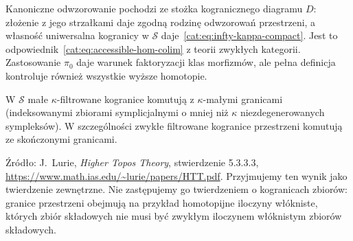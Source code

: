 Kanoniczne odwzorowanie pochodzi ze stożka kogranicznego diagramu $D$: złożenie z jego strzałkami daje zgodną rodzinę odwzorowań przestrzeni, a własność uniwersalna kogranicy w $\mathcal S$ daje~\eqref{cat:eq:infty-kappa-compact}. Jest to odpowiednik~\eqref{cat:eq:accessible-hom-colim} z teorii zwykłych kategorii. Zastosowanie $\pi_0$ daje warunek faktoryzacji klas morfizmów, ale pełna definicja kontroluje również wszystkie wyższe homotopie.

\begin{twierdzenie}\label{cat:thm:infty-filtered-space-limits}
W $\mathcal S$ małe $\kappa$-filtrowane kogranice komutują z $\kappa$-małymi granicami (indeksowanymi zbiorami symplicjalnymi o mniej niż $\kappa$ niezdegenerowanych sympleksów). W szczególności zwykłe filtrowane kogranice przestrzeni komutują ze skończonymi granicami.
\end{twierdzenie}

Źródło: J.~Lurie, \emph{Higher Topos Theory}, stwierdzenie 5.3.3.3, \url{https://www.math.ias.edu/~lurie/papers/HTT.pdf}. Przyjmujemy ten wynik jako twierdzenie zewnętrzne. Nie zastępujemy go twierdzeniem o kogranicach zbiorów: granice przestrzeni obejmują na przykład homotopijne iloczyny włókniste, których zbiór składowych nie musi być zwykłym iloczynem włóknistym zbiorów składowych.

